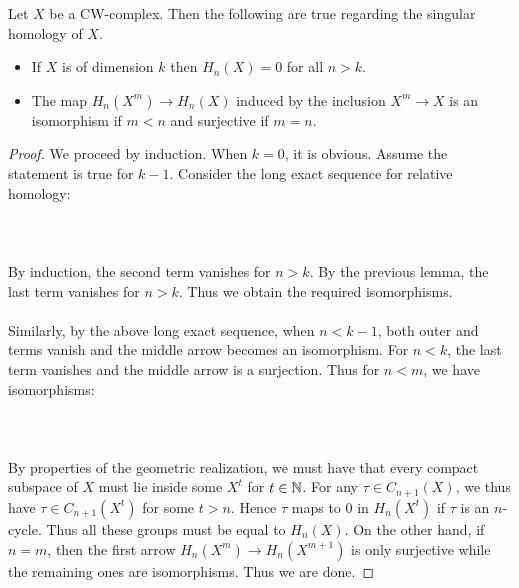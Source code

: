 \documentclass[a4paper]{article}
\begin{document}
\begin{lmm}{}{} Let $X$ be a CW-complex. Then the following are true regarding the singular homology of $X$. 
\begin{itemize}
\item If $X$ is of dimension $k$ then $H_n(X)=0$ for all $n>k$. 
\item The map $H_n(X^m)\to H_n(X)$ induced by the inclusion $X^m\to X$ is an isomorphism if $m<n$ and surjective if $m=n$. 
\end{itemize} \tcbline
\begin{proof}
We proceed by induction. When $k=0$, it is obvious. Assume the statement is true for $k-1$. Consider the long exact sequence for relative homology: \\~\\
\\~\\
By induction, the second term vanishes for $n>k$. By the previous lemma, the last term vanishes for $n>k$. Thus we obtain the required isomorphisms. \\~\\

Similarly, by the above long exact sequence, when $n<k-1$, both outer and terms vanish and the middle arrow becomes an isomorphism. For $n<k$, the last term vanishes and the middle arrow is a surjection. Thus for $n<m$, we have isomorphisms: \\~\\
\\~\\
By properties of the geometric realization, we must have that every compact subspace of $X$ must lie inside some $X^t$ for $t\in\mathbb{N}$. For any $\tau\in C_{n+1}(X)$, we thus have $\tau\in C_{n+1}(X^t)$ for some $t>n$. Hence $\tau$ maps to $0$ in $H_n(X^t)$ if $\tau$ is an $n$-cycle. Thus all these groups must be equal to $H_n(X)$. On the other hand, if $n=m$, then the first arrow $H_n(X^m)\to H_n(X^{m+1})$ is only surjective while the remaining ones are isomorphisms. Thus we are done. 
\end{proof}
\end{lmm}
\end{document}
